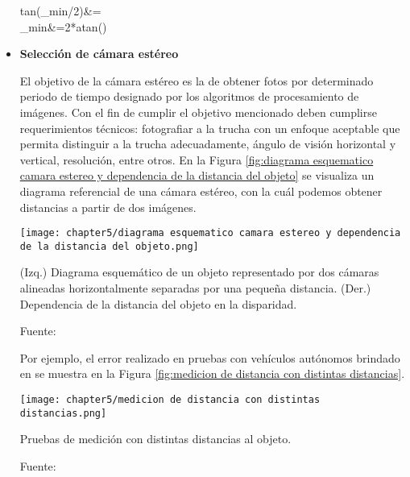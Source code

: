 \begin{itemize}
	\begin{myequation}\label{eq:calculo beta de distancia entre espejos y camara estereo}
		\begin{split}
			tan(\beta_{min}/2)&=\\
			\beta_{min}&=2*atan()\\
		\end{split}		
	\end{myequation}


	
	\item \textbf{Selección de cámara estéreo}
	
	El objetivo de la cámara estéreo es la de obtener fotos por determinado periodo de tiempo designado por los algoritmos de procesamiento de imágenes. Con el fin de cumplir el objetivo mencionado deben cumplirse requerimientos técnicos: fotografiar a la trucha con un enfoque aceptable que permita distinguir a la trucha adecuadamente, ángulo de visión horizontal y vertical, resolución, entre otros. En la Figura \ref{fig:diagrama esquematico camara estereo y dependencia de la distancia del objeto} se visualiza un diagrama referencial de una cámara estéreo, con la cuál podemos obtener distancias a partir de dos imágenes. 
	
	\begin{myfigure}[H]
		\centering
		\texttt{[image: chapter5/diagrama esquematico camara estereo y dependencia de la distancia del objeto.png]}
		\caption[Diagrama esquemático y dependencia de la distancia del objeto seguido por una cámara estéreo.]{(Izq.) Diagrama esquemático de un objeto representado por dos cámaras alineadas horizontalmente separadas por una pequeña distancia. (Der.) Dependencia de la distancia del objeto en la disparidad.}
		\begin{myflushleftportland}
			Fuente: \cite{Mahammed2013}
		\end{myflushleftportland}
		\label{fig:diagrama esquematico camara estereo y dependencia de la distancia del objeto}
	\end{myfigure}
	
	Por ejemplo, el error realizado en pruebas con vehículos autónomos brindado en \cite{Zaarane2020} se muestra en la Figura \ref{fig:medicion de distancia con distintas distancias}. 
	
	\begin{myfigure}[H]
		\centering
		\texttt{[image: chapter5/medicion de distancia con distintas distancias.png]}
		\caption{Pruebas de medición con distintas distancias al objeto.}
		\begin{myflushleftportland}
			Fuente: \cite{Zaarane2020}
		\end{myflushleftportland}
		\label{fig:medicion de distancia con distintas distancias}
	\end{myfigure}
		

\end{itemize}
